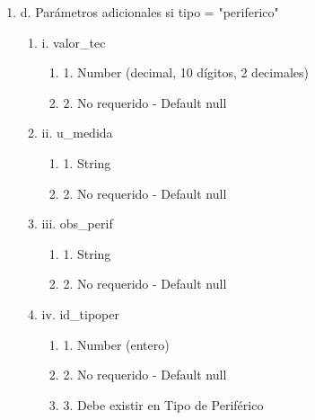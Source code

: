 \begin{enumerate}
\begin{enumerate}
\begin{enumerate}
                \item xi. id\_so
                    \begin{enumerate}
                        \item 1. Number (entero)
                        \item 2. No requerido - Default null
                        \item 3. Debe existir en Edición de Sistema Operativo
                    \end{enumerate}
            \end{enumerate}
        \item d. Parámetros adicionales si tipo = "periferico"
            \begin{enumerate}
                \item i. valor\_tec
                    \begin{enumerate}
                        \item 1. Number (decimal, 10 dígitos, 2 decimales)
                        \item 2. No requerido - Default null
                    \end{enumerate}
                \item ii. u\_medida
                    \begin{enumerate}
                        \item 1. String
                        \item 2. No requerido - Default null
                    \end{enumerate}
                \item iii. obs\_perif
                    \begin{enumerate}
                        \item 1. String
                        \item 2. No requerido - Default null
                    \end{enumerate}
                \item iv. id\_tipoper
                    \begin{enumerate}
                        \item 1. Number (entero)
                        \item 2. No requerido - Default null
                        \item 3. Debe existir en Tipo de Periférico
                    \end{enumerate}
            \end{enumerate}
    \end{enumerate}


\end{enumerate}
